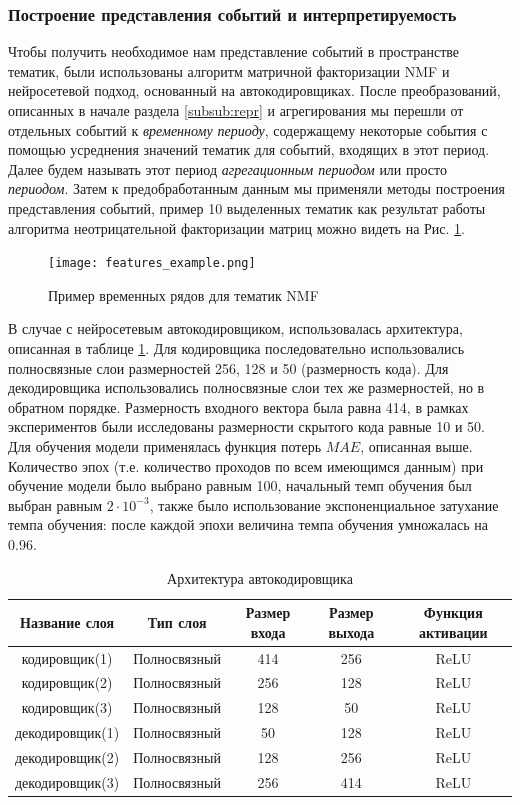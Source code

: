 \subsubsection{Построение представления событий и интерпретируемость}
Чтобы получить необходимое нам представление событий в пространстве тематик, были использованы алгоритм матричной факторизации NMF и нейросетевой подход, основанный на автокодировщиках.
После преобразований, описанных в начале раздела \ref{subsub:repr} и агрегирования мы перешли от отдельных событий к \textit{временному периоду}, содержащему некоторые события с помощью усреднения значений тематик для событий, входящих в этот период. Далее будем называть этот период \textit{агрегационным периодом} или просто \textit{периодом}. Затем к предобработанным данным мы применяли методы построения представления событий, пример 10 выделенных тематик как результат работы алгоритма неотрицательной факторизации матриц можно видеть на  Рис. \ref{fig:features_example}.

\begin{figure}
  \texttt{[image: features\_example.png]}
  \caption{Пример временных рядов для тематик NMF}
  \label{fig:features_example}
\end{figure}

В случае с нейросетевым автокодировщиком, использовалась архитектура, описанная в таблице \ref{table:ae_arch}. Для кодировщика последовательно использовались полносвязные слои размерностей 256, 128 и 50 (размерность кода). Для декодировщика использовались полносвязные слои тех же размерностей, но в обратном порядке. Размерность входного вектора была равна 414, в рамках экспериментов были исследованы размерности скрытого кода равные 10 и 50. Для обучения модели применялась функция потерь $MAE$, описанная выше.
Количество эпох (т.е. количество проходов по всем имеющимся данным) при обучение модели было выбрано равным 100, начальный темп обучения был выбран равным  $2\cdot 10^{-3}$, также было использование экспоненциальное затухание темпа обучения: после каждой эпохи величина темпа обучения умножалась на 0.96.

\begin{table}
\centering
 \begin{tabular}{| c | c | c | c | c |} 
 \hline
 Название слоя & Тип слоя & Размер входа & Размер выхода & Функция активации\\
 \hline
 \hline
 кодировщик(1) & Полносвязный & 414 & 256 & ReLU\\ 
 \hline
 кодировщик(2) & Полносвязный & 256 & 128 & ReLU\\ 
 \hline
 кодировщик(3) & Полносвязный & 128 & 50 & ReLU\\ 
 \hline
 декодировщик(1) & Полносвязный & 50 & 128 & ReLU\\ 
 \hline
 декодировщик(2) & Полносвязный & 128 & 256 & ReLU\\ 
 \hline
 декодировщик(3) & Полносвязный & 256 & 414 & ReLU\\ 
 \hline
\end{tabular}
\caption{Архитектура автокодировщика}
\label{table:ae_arch}
\end{table}

